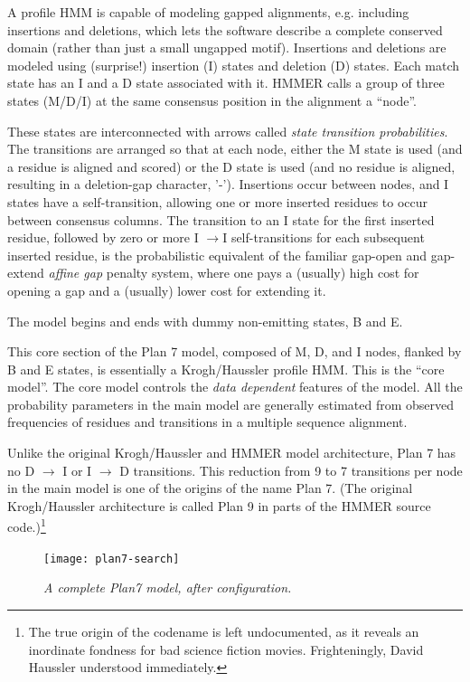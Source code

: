 A profile HMM is capable of modeling gapped alignments, e.g. including
insertions and deletions, which lets the software describe a complete
conserved domain (rather than just a small ungapped motif). Insertions
and deletions are modeled using (surprise!) insertion (I) states and
deletion (D) states. Each match state has an I and a D state
associated with it. HMMER calls a group of three states (M/D/I) at the
same consensus position in the alignment a ``node''.

These states are interconnected with arrows called \emph{state
transition probabilities}. The transitions are arranged so that at
each node, either the M state is used (and a residue is aligned and
scored) or the D state is used (and no residue is aligned, resulting
in a deletion-gap character, '-'). Insertions occur between nodes, and
I states have a self-transition, allowing one or more inserted
residues to occur between consensus columns. The transition to an I
state for the first inserted residue, followed by zero or more I
$\rightarrow$I self-transitions for each subsequent inserted residue,
is the probabilistic equivalent of the familiar gap-open and
gap-extend \emph{affine gap} penalty system, where one pays a
(usually) high cost for opening a gap and a (usually) lower cost for
extending it.

The model begins and ends with dummy non-emitting states, B and E.

This core section of the Plan 7 model, composed of M, D, and I nodes,
flanked by B and E states, is essentially a Krogh/Haussler profile
HMM.  This is the ``core model''. The core model controls the
\textit{data dependent} features of the model. All the probability
parameters in the main model are generally estimated from observed
frequencies of residues and transitions in a multiple sequence
alignment.

Unlike the original Krogh/Haussler and HMMER model architecture, Plan
7 has no D $\rightarrow$ I or I $\rightarrow$ D transitions. This
reduction from 9 to 7 transitions per node in the main model is one of
the origins of the name Plan 7. (The original Krogh/Haussler
architecture is called Plan 9 in parts of the HMMER source
code.)\footnote{The true origin of the codename is left undocumented,
as it reveals an inordinate fondness for bad science fiction
movies. Frighteningly, David Haussler understood immediately.}

\begin{figure}[t]
\texttt{[image: plan7-search]}
\caption{\textit{A complete Plan7 model, after configuration.}}
\end{figure}

